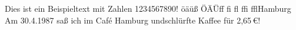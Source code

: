 \documentclass[ngerman,a4paper,10pt]{article}
\def\BSP{%
Dies ist ein Beispieltext mit Zahlen 1234567890!\newline%
öäüß ÖÄÜ\quad ff fi fl ffi ffl\quad Hamburg\newline%
Am 30.4.1987 saß ich im \glqq{}Caf\'e Hamburg\grqq{} und\newline schlürfte Kaffee für 2,65\,€!}
\begin{document}
\BSP
\end{document}
